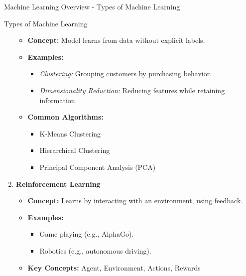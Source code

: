 \documentclass[aspectratio=169]{beamer}
\begin{document}
\begin{frame}[fragile]{Machine Learning Overview - Types of Machine Learning}
\begin{block}{Types of Machine Learning}
\begin{enumerate}
\begin{itemize}
                    \item \textbf{Concept:} Model learns from data without explicit labels.
                    \item \textbf{Examples:}
                        \begin{itemize}
                            \item \textit{Clustering:} Grouping customers by purchasing behavior.
                            \item \textit{Dimensionality Reduction:} Reducing features while retaining information.
                        \end{itemize}
                    \item \textbf{Common Algorithms:}
                        \begin{itemize}
                            \item K-Means Clustering
                            \item Hierarchical Clustering
                            \item Principal Component Analysis (PCA)
                        \end{itemize}
                \end{itemize}
            \item \textbf{Reinforcement Learning}
                \begin{itemize}
                    \item \textbf{Concept:} Learns by interacting with an environment, using feedback.
                    \item \textbf{Examples:}
                        \begin{itemize}
                            \item Game playing (e.g., AlphaGo).
                            \item Robotics (e.g., autonomous driving).
                        \end{itemize}
                    \item \textbf{Key Concepts:} Agent, Environment, Actions, Rewards
                \end{itemize}
        \end{enumerate}
    \end{block}
\end{frame}
\end{document}
